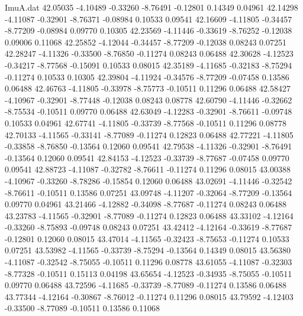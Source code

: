\begin{filecontents}{ImuA.dat}
  42.05035   -4.10489   -0.33260   -8.76491   -0.12801    0.14349    0.04961
  42.14298   -4.11087   -0.32901   -8.76371   -0.08984    0.10533    0.09541
  42.16609   -4.11805   -0.34457   -8.77209   -0.08984    0.09770    0.10305
  42.23569   -4.11446   -0.33619   -8.76252   -0.12038    0.09006    0.11068
  42.25852   -4.12044   -0.34457   -8.77209   -0.12038    0.08243    0.07251
  42.28247   -4.11326   -0.33500   -8.76850   -0.11274    0.08243    0.06488
  42.30628   -4.12523   -0.34217   -8.77568   -0.15091    0.10533    0.08015
  42.35189   -4.11685   -0.32183   -8.75294   -0.11274    0.10533    0.10305
  42.39804   -4.11924   -0.34576   -8.77209   -0.07458    0.13586    0.06488
  42.46763   -4.11805   -0.33978   -8.75773   -0.10511    0.11296    0.06488
  42.58427   -4.10967   -0.32901   -8.77448   -0.12038    0.08243    0.08778
  42.60790   -4.11446   -0.32662   -8.75534   -0.10511    0.09770    0.06488
  42.63049   -4.12283   -0.32901   -8.76611   -0.09748    0.10533    0.04961
  42.67741   -4.11805   -0.33739   -8.77568   -0.10511    0.11296    0.08778
  42.70133   -4.11565   -0.33141   -8.77089   -0.11274    0.12823    0.06488
  42.77221   -4.11805   -0.33858   -8.76850   -0.13564    0.12060    0.09541
  42.79538   -4.11326   -0.32901   -8.76491   -0.13564    0.12060    0.09541
  42.84153   -4.12523   -0.33739   -8.77687   -0.07458    0.09770    0.09541
  42.88723   -4.11087   -0.32782   -8.76611   -0.11274    0.11296    0.08015
  43.00388   -4.10967   -0.33260   -8.78286   -0.15854    0.12060    0.06488
  43.02691   -4.11446   -0.32542   -8.76611   -0.10511    0.13586    0.07251
  43.09748   -4.11207   -0.32064   -8.77209   -0.13564    0.09770    0.04961
  43.21466   -4.12882   -0.34098   -8.77687   -0.11274    0.08243    0.06488
  43.23783   -4.11565   -0.32901   -8.77089   -0.11274    0.12823    0.06488
  43.33102   -4.12164   -0.33260   -8.75893   -0.09748    0.08243    0.07251
  43.42412   -4.12164   -0.33619   -8.77687   -0.12801    0.12060    0.08015
  43.47014   -4.11565   -0.32423   -8.75653   -0.11274    0.10533    0.07251
  43.53982   -4.11565   -0.33739   -8.75294   -0.13564    0.14349    0.08015
  43.56380   -4.11087   -0.32542   -8.75055   -0.10511    0.11296    0.08778
  43.61055   -4.11087   -0.32303   -8.77328   -0.10511    0.15113    0.04198
  43.65654   -4.12523   -0.34935   -8.75055   -0.10511    0.09770    0.06488
  43.72596   -4.11685   -0.33739   -8.77089   -0.11274    0.13586    0.06488
  43.77344   -4.12164   -0.30867   -8.76012   -0.11274    0.11296    0.08015
  43.79592   -4.12403   -0.33500   -8.77089   -0.10511    0.13586    0.11068

\end{filecontents}
